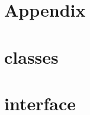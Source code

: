 \documentclass[11pt,a4paper]{article}
\renewcommand{\theequation}{\arabic{section}.\arabic{equation}}
\begin{document}
\section*{Appendix}
\appendix

\renewcommand{\theequation}{\Alph{section}.\arabic{equation}}
\setcounter{equation}{0}  %







\section{\CPP classes}\label{app:classes}
\setcounter{equation}{0}


\section{\PY interface}\label{app:modules}
\setcounter{equation}{0}
\end{document}
